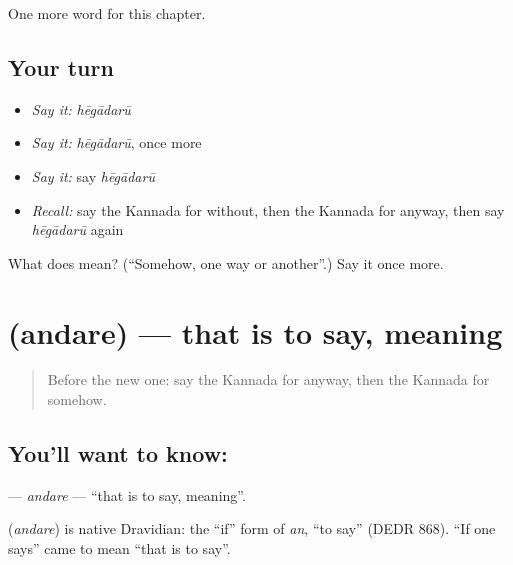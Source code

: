\begin{grammarlens}[title={What you've built}]
One more word for this chapter.
\end{grammarlens}

\subsection*{Your turn}
\begin{itemize}
\raggedright
  \item \emph{Say it:} \emph{hēgādarū}
  \item \emph{Say it:} \emph{hēgādarū}, once more
  \item \emph{Say it:} say \emph{hēgādarū}
  \item \emph{Recall:} say the Kannada for without, then the Kannada for anyway, then say \emph{hēgādarū} again
\end{itemize}

\begin{tcolorbox}[breakable,colback=teal!4,colframe=teal!35!black,title={Before you move on}]
What does  mean? (\textquotedblleft{}Somehow, one way or another\textquotedblright{}.) Say it once more.
\end{tcolorbox}
\section[\texorpdfstring{\kn{ಅಂದರೆ} (andare)}{ಅಂದರೆ (andare)}]{ (andare) — that is to say, meaning}

\label{lesson:KA-C289-andare}



\begin{quote}
Before the new one: say the Kannada for anyway, then the Kannada for somehow.
\end{quote}

\subsection*{You'll want to know: }
\textbf{} — \emph{andare} — \textquotedblleft{}that is to say, meaning\textquotedblright{}.

\begin{cousinweb}
\textbf{} (\emph{andare}) is native Dravidian: the \textquotedblleft{}if\textquotedblright{} form of \emph{an}, \textquotedblleft{}to say\textquotedblright{} (DEDR 868). \textquotedblleft{}If one says\textquotedblright{} came to mean \textquotedblleft{}that is to say\textquotedblright{}.
\end{cousinweb}

